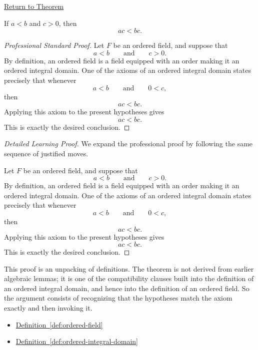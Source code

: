 \newpage
{}
\label{prf:multiply-positive}

\begin{remark*}[Return]
\hyperref[thm:multiply-positive]{Return to Theorem}
\end{remark*}

\begin{theorem*}
If $a<b$ and $c>0$, then
\[
ac<bc.
\]
\end{theorem*}

\begin{proof}[Professional Standard Proof]
\LRAProofBodyStart
Let $F$ be an ordered field, and suppose that
\[
a<b
\qquad\text{and}\qquad
c>0.
\]
By definition, an ordered field is a field equipped with an order making it
an ordered integral domain.  One of the axioms of an ordered integral domain
states precisely that whenever
\[
a<b
\qquad\text{and}\qquad
0<c,
\]
then
\[
ac<bc.
\]
Applying this axiom to the present hypotheses gives
\[
ac<bc.
\]
This is exactly the desired conclusion.
\end{proof}

\begin{proof}[Detailed Learning Proof]
\LRAProofBodyStart
We expand the professional proof by following the same sequence of justified moves.

Let $F$ be an ordered field, and suppose that
\[
a<b
\qquad\text{and}\qquad
c>0.
\]
By definition, an ordered field is a field equipped with an order making it
an ordered integral domain.  One of the axioms of an ordered integral domain
states precisely that whenever
\[
a<b
\qquad\text{and}\qquad
0<c,
\]
then
\[
ac<bc.
\]
Applying this axiom to the present hypotheses gives
\[
ac<bc.
\]
This is exactly the desired conclusion.
\end{proof}

\begin{remark*}
This proof is an unpacking of definitions.  The theorem is not derived from
earlier algebraic lemmas; it is one of the compatibility clauses built into
the definition of an ordered integral domain, and hence into the definition
of an ordered field.  So the argument consists of recognizing that the
hypotheses match the axiom exactly and then invoking it.
\end{remark*}

\begin{dependencies}
\begin{itemize}
  \item \hyperref[def:ordered-field]{Definition~\ref*{def:ordered-field}}
  \item \hyperref[def:ordered-integral-domain]{Definition~\ref*{def:ordered-integral-domain}}
\end{itemize}
\end{dependencies}

\clearpage

